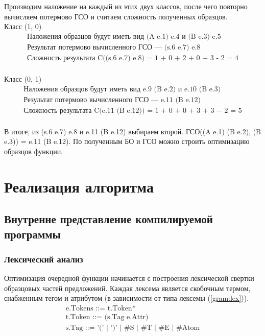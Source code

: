 \documentclass[12pt]{article}
\begin{document}
\indent Производим наложение на каждый из этих двух классов, после чего повторно вычисляем потермово ГСО и считаем сложность полученных образцов.\\
\indent Класс (1, 0)
\begin{equation*}
\begin{array}{l}
\textrm{Наложения образцов будут иметь вид (A e.1) e.4 и (B e.3) e.5} \\
\textrm{Результат потермово вычисленного ГСО --- (s.6 e.7) e.8} \\
\textrm{Сложность результата C((s.6 e.7) e.8) = 1 + 0 + 2 + 0 + 3 - 2 = 4} \\
\end{array}
\end{equation*} 

\indent Класс (0, 1)
\begin{equation*}
\begin{array}{l}
\textrm{Наложения образцов будут иметь вид e.9 (B e.2) и e.10 (B e.3)} \\
\textrm{Результат потермово вычисленного ГСО --- e.11 (B e.12)} \\
\textrm{Сложность результата C(e.11 (B e.12)) = 1 + 0 + 0 + 3 + 3 − 2 = 5} \\
\end{array}
\end{equation*} 

\indent В итоге, из (s.6 e.7) e.8 и e.11 (B e.12) выбираем второй. ГСО((A e.1) (B e.2), (B e.3)) = e.11 (B e.12). По полученным БО и ГСО можно строить оптимизацию образцов функции.

\newpage

\section[Реализация алгоритма]{\large \centering Реализация алгоритма}
\subsection[Внутренне представление компилируемой программы]{\large Внутренне представление компилируемой программы}
\subsubsection[Лексический анализ]{\large Лексический анализ}
\hspace{\parindent} Оптимизация очередной функции начинается с построения лексической свертки образцовых частей предложений. Каждая лексема является скобочным термом, снабженным тегом и атрибутом (в зависимости от типа лексемы (\ref{gram:lex})).
\begin{equation}\label{gram:lex}
\begin{array}{l}
\textrm{e.Tokens ::= t.Token*} \\
\textrm{t.Token ::= (s.Tag e.Attr)} \\
\textrm{s.Tag ::= '(' | ')' | \#S | \#T | \#E | \#Atom} \\
\end{array}
\end{equation}
\end{document}
